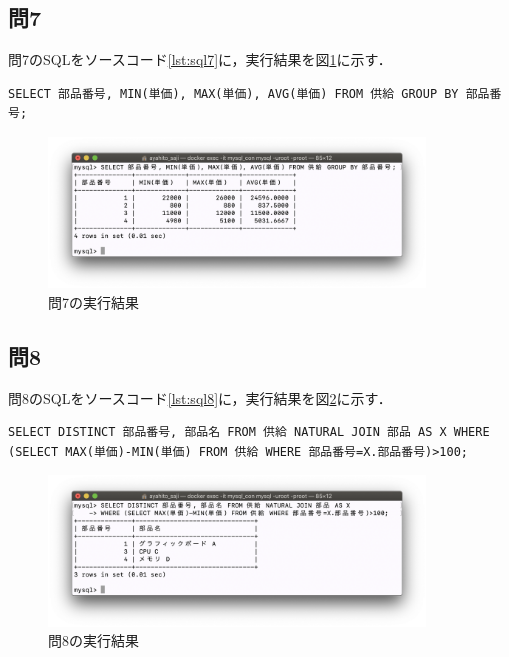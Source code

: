 \documentclass[uplatex]{jsarticle}
\begin{document}
\subsection{問7}
問7のSQLをソースコード\ref{lst:sql7}に，実行結果を図\ref{fig:ans7}に示す．
\begin{lstlisting}[caption=問7のSQL,label=lst:sql7]
SELECT 部品番号, MIN(単価), MAX(単価), AVG(単価) FROM 供給 GROUP BY 部品番号;
\end{lstlisting}
\begin{figure}[htb]
\begin{center}
\includegraphics[width=100mm]{figures/ans7.png}
\caption{問7の実行結果}
\label{fig:ans7}
\end{center}
\end{figure}

\subsection{問8}
問8のSQLをソースコード\ref{lst:sql8}に，実行結果を図\ref{fig:ans8}に示す．
\begin{lstlisting}[caption=問8のSQL,label=lst:sql8]
SELECT DISTINCT 部品番号, 部品名 FROM 供給 NATURAL JOIN 部品 AS X WHERE (SELECT MAX(単価)-MIN(単価) FROM 供給 WHERE 部品番号=X.部品番号)>100;
\end{lstlisting}
\begin{figure}[htb]
\begin{center}
\includegraphics[width=100mm]{figures/ans8.png}
\caption{問8の実行結果}
\label{fig:ans8}
\end{center}
\end{figure}
\end{document}
